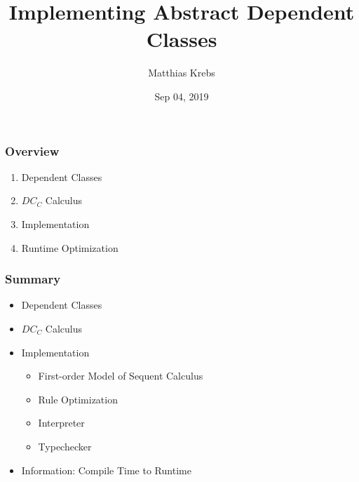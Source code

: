 \documentclass[leqno]{beamer}
\title{Implementing Abstract Dependent Classes}
\author{Matthias Krebs}
\date{Sep 04, 2019}
\begin{document}
\maketitle

\begin{frame}
\frametitle{Overview}

\begin{enumerate}
  \item Dependent Classes
  \item $DC_C$ Calculus
  \item Implementation
  \item Runtime Optimization %
\end{enumerate}
\end{frame}









\begin{frame}
\frametitle{Summary}

\begin{itemize}
\item Dependent Classes
\item $DC_C$ Calculus
\item Implementation
  \begin{itemize}
    \item First-order Model of Sequent Calculus
    \item Rule Optimization
    \item Interpreter
    \item Typechecker
  \end{itemize}
\item Information: Compile Time to Runtime
\end{itemize}
\end{frame}
\end{document}
